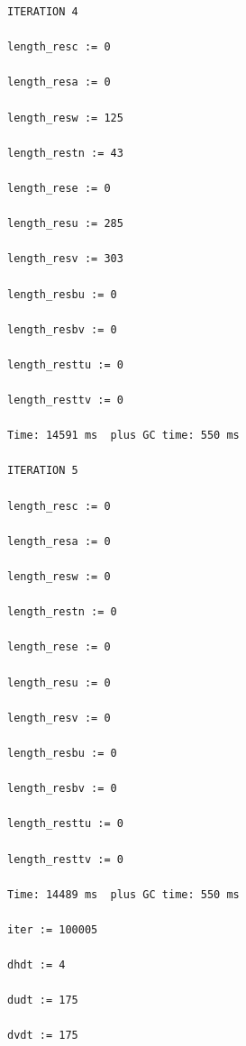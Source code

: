 \documentclass[12pt,a5paper]{article}
\begin{document}
\begin{verbatim}
ITERATION 4

length_resc := 0

length_resa := 0

length_resw := 125

length_restn := 43

length_rese := 0

length_resu := 285

length_resv := 303

length_resbu := 0

length_resbv := 0

length_resttu := 0

length_resttv := 0

Time: 14591 ms  plus GC time: 550 ms

ITERATION 5

length_resc := 0

length_resa := 0

length_resw := 0

length_restn := 0

length_rese := 0

length_resu := 0

length_resv := 0

length_resbu := 0

length_resbv := 0

length_resttu := 0

length_resttv := 0

Time: 14489 ms  plus GC time: 550 ms

iter := 100005

dhdt := 4

dudt := 175

dvdt := 175
\end{verbatim}




\end{document}
